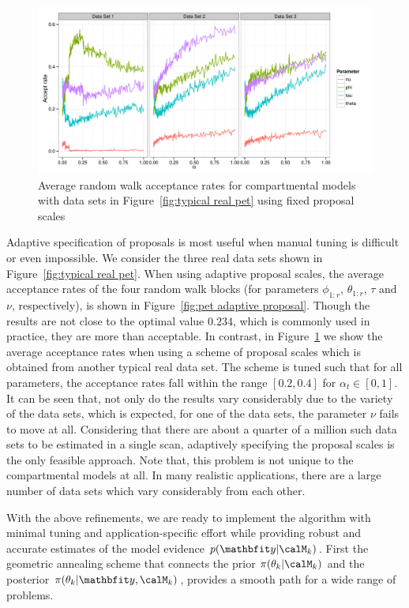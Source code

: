 \begin{figure}[t]
  \includegraphics[width=\linewidth]{fig/Fixed_Proposal}
  \caption{Average random walk acceptance rates for \pet compartmental models
    with data sets in Figure~\ref{fig:typical real pet} using fixed proposal
    scales}
  \label{fig:pet fixed proposal}
\end{figure}

Adaptive specification of proposals is most useful when manual tuning is
difficult or even impossible. We consider the three real \pet data sets shown
in Figure~\ref{fig:typical real pet}. When using adaptive proposal scales, the
average acceptance rates of the four random walk blocks (for parameters
$\phi_{1:r}$, $\theta_{1:r}$, $\tau$ and $\nu$, respectively), is shown in
Figure~\ref{fig:pet adaptive proposal}. Though the results are not close to
the optimal value $0.234$, which is commonly used in practice, they are more
than acceptable. In contrast, in Figure~\ref{fig:pet fixed proposal} we show
the average acceptance rates when using a scheme of proposal scales which is
obtained from another typical real \pet data set. The scheme is tuned such
that for all parameters, the acceptance rates fall within the range $[0.2,
0.4]$ for $\alpha_t \in [0, 1]$. It can be seen that, not only do the results
vary considerably due to the variety of the data sets, which is expected, for
one of the data sets, the parameter $\nu$ fails to move at all. Considering
that there are about a quarter of a million such data sets to be estimated in
a single \pet scan, adaptively specifying the proposal scales is the only
feasible approach. Note that, this problem is not unique to the \pet
compartmental models at all. In many realistic applications, there are a large
number of data sets which vary considerably from each other.

With the above refinements, we are ready to implement the \smc[2] algorithm
with minimal tuning and application-specific effort while providing robust and
accurate estimates of the model evidence $p(\data|\calM_k)$. First the
geometric annealing scheme that connects the prior $\pi(\theta_k|\calM_k)$ and
the posterior $\pi(\theta_k|\data,\calM_k)$, provides a smooth path for a wide
range of problems.

